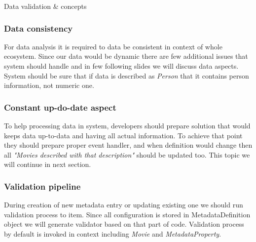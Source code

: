 \documentclass{beamer}
\begin{document}
\begin{section}{Data validation \& concepts}

\begin{frame}
\frametitle{Data consistency}
For data analysis it is required to data be consistent in context of whole ecosystem. Since our data would be dynamic there are few additional issues that system should handle and in few following slides we will discuss data aspects. \newline \newline
System should be sure that if data is described as \textit{Person} that it contains person information, not numeric one.
\end{frame}

\begin{frame}
\frametitle{Constant up-do-date aspect}
To help processing data in system, developers should prepare solution that would keeps data up-to-data and having all actual information. To achieve that point they should prepare proper event handler, and when definition would change then all \textit{"Movies described with that description"} should be updated too. \newline
\newline
This topic we will continue in next section.

\end{frame}

\begin{frame}
\frametitle{Validation pipeline}
During creation of new metadata entry or updating existing one we should run validation process to  item. Since all configuration is stored in MetadataDefinition object we will generate validator based on that part of code. Validation process by default is invoked in context including \textit{Movie} and \textit{MetadataProperty}.
\end{frame}


\end{section}
\end{document}
